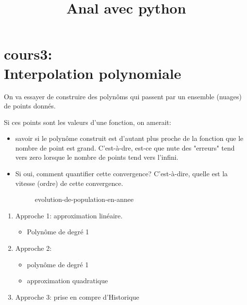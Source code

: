 \documentclass[a4paper]{report}
\title{Anal avec python}
\begin{document}
\maketitle
\tableofcontents



\chapter{cours3:\\Interpolation polynomiale}
On va essayer de construire des polynôms qui passent par un ensemble (nuages) de points donnés.

Si ces points sont les valeurs d'une fonction, on amerait:
\begin{itemize}
    \item savoir si le polynôme construit est d'autant plus proche de la fonction que le nombre de point est grand. C'est-à-dre, est-ce que nute des "erreurs" tend vers zero lorsque le nombre de points tend vers l'infini.
    \item Si oui, comment quantifier cette convergence? C'est-à-dire, quelle est la vitesse (ordre) de cette convergence.
        \begin{figure}[H]
            \centering
            \caption{evolution-de-population-en-annee}
            \label{fig:evolution-de-population-en-annee}
        \end{figure}
\end{itemize}
\begin{enumerate}
    \item Approche 1: approximation linéaire. 
        \begin{itemize}
            \item Polynôme de degré 1
        \end{itemize}
    \item Approche 2: 
        \begin{itemize}
            \item polynôme de degré 1
            \item approximation quadratique
        \end{itemize}
    \item Approche 3: prise en compre d'Historique
\end{enumerate}
\end{document}
